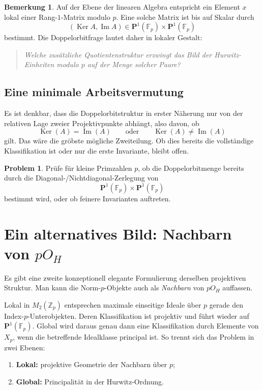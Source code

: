 \documentclass[12pt,a4paper]{article}
\theoremstyle{definition}
\newtheorem{bemerkung}[satz]{Bemerkung}
\newtheorem{problem}[satz]{Problem}
\newcommand{\OH}{O_H}
\newcommand{\Z}{\mathbb{Z}}
\newcommand{\Fp}{\mathbb{F}_p}
\newcommand{\Ker}{\operatorname{Ker}}
\newcommand{\Image}{\operatorname{Im}}
\begin{document}
	\begin{bemerkung}
		Auf der Ebene der linearen Algebra entspricht ein Element \(x\) lokal einer Rang-\(1\)-Matrix modulo \(p\). Eine solche Matrix ist bis auf Skalar durch
		\[
		(\Ker A,\Image A)\in \mathbf P^1(\Fp)\times \mathbf P^1(\Fp)
		\]
		bestimmt. Die Doppelorbitfrage lautet daher in lokaler Gestalt:
		\begin{quote}
			\emph{Welche zusätzliche Quotientenstruktur erzwingt das Bild der Hurwitz-Einheiten modulo \(p\) auf der Menge solcher Paare?}
		\end{quote}
	\end{bemerkung}
	
	\subsection{Eine minimale Arbeitsvermutung}
	
	Es ist denkbar, dass die Doppelorbitstruktur in erster Näherung nur von der relativen Lage zweier Projektivpunkte abhängt, also davon, ob
	\[
	\Ker(A)=\Image(A)
	\qquad\text{oder}\qquad
	\Ker(A)\neq \Image(A)
	\]
	gilt. Das wäre die gröbste mögliche Zweiteilung. Ob dies bereits die vollständige Klassifikation ist oder nur die erste Invariante, bleibt offen.
	
	\begin{problem}
		Prüfe für kleine Primzahlen \(p\), ob die Doppelorbitmenge bereits durch die Diagonal-/Nichtdiagonal-Zerlegung von
		\[
		\mathbf P^1(\Fp)\times \mathbf P^1(\Fp)
		\]
		bestimmt wird, oder ob feinere Invarianten auftreten.
	\end{problem}
	
	\section{Ein alternatives Bild: Nachbarn von \(p\OH\)}
	
	Es gibt eine zweite konzeptionell elegante Formulierung derselben projektiven Struktur. Man kann die Norm-\(p\)-Objekte auch als \emph{Nachbarn} von \(p\OH\) auffassen.
	
	Lokal in \(M_2(\Z_p)\) entsprechen maximale einseitige Ideale über \(p\) gerade den Index-\(p\)-Unterobjekten. Deren Klassifikation ist projektiv und führt wieder auf \(\mathbf P^1(\Fp)\). Global wird daraus genau dann eine Klassifikation durch Elemente von \(X_p\), wenn die betreffende Idealklasse principal ist. So trennt sich das Problem in zwei Ebenen:
	
	\begin{enumerate}[label=(\alph*)]
		\item \textbf{Lokal:} projektive Geometrie der Nachbarn über \(p\);
		\item \textbf{Global:} Principalität in der Hurwitz-Ordnung.
	\end{enumerate}
	
\end{document}
